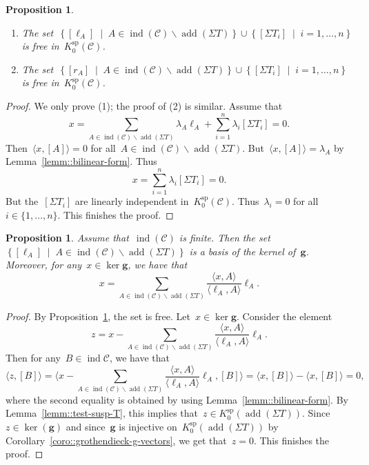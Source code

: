 \documentclass{amsart}
\newtheorem{proposition}[theorem]{Proposition}
\theoremstyle{definition}
\renewcommand{\b}[1]{{\boldsymbol{#1}}} %
\newcommand{\set}[2]{\left\{ #1 \;\middle|\; #2 \right\}} %
\newcommand{\ssm}{\smallsetminus} %
\newcommand{\cat}{\mathcal{C}}
\newcommand{\susp}{\Sigma}
\newcommand{\add}{\operatorname{add}}
\newcommand{\spl}{\operatorname{sp}}
\newcommand{\Ksp}{K_0^{\spl}}
\newcommand{\ind}{\operatorname{ind}}
\begin{document}
\begin{proposition}
\label{prop::free-set}
 \begin{enumerate}
  \item The set~$\set{[\ell_A]}{A\in \ind(\cat) \ssm \add(\susp T)} \cup \set{[\susp T_i]}{i=1, \dots, n}$ is free in~$\Ksp(\cat)$.
  \item The set~$\set{[r_A]}{A\in \ind(\cat) \ssm \add(\susp T)} \cup \set{[\susp T_i]}{i=1, \dots, n}$ is free in~$\Ksp(\cat)$.
 \end{enumerate}
\end{proposition}
\begin{proof}
 We only prove (1); the proof of (2) is similar.  Assume that~
 \[
  x= \sum_{A\in \ind(\cat) \ssm \add(\susp T)} \lambda_A \ell_A + \sum_{i=1}^n \lambda_i [\susp T_i] = 0.
 \]
 Then~$\langle x, [A] \rangle = 0$ for all~$A\in\ind(\cat) \ssm \add(\susp T)$.  But~$\langle x, [A] \rangle = \lambda_A$ by Lemma~\ref{lemm::bilinear-form}.  Thus~
 \[
  x = \sum_{i=1}^n \lambda_i [\susp T_i] = 0.
 \]
 But the~$[\susp T_i]$ are linearly independent in~$\Ksp(\cat)$.  Thus~$\lambda_i = 0$ for all~$i\in \{1, \ldots, n\}$.  This finishes the proof.
\end{proof}

\begin{proposition}
 Assume that~$\ind(\cat)$ is finite.  Then the set~$\set{[\ell_A]}{A\in \ind(\cat) \ssm \add(\susp T)}$ is a basis of the kernel of~$\b g$.  Moreover, for any~$x\in \ker \b g$, we have that
 \[
  x= \sum_{A\in \ind(\cat) \ssm \add(\susp T)} \frac{\langle x, A \rangle}{\langle \ell_A, A \rangle} \ell_A.
 \]
\end{proposition}
\begin{proof}
By Proposition~\ref{prop::free-set}, the set is free.  Let~$x\in \ker \b g$.  Consider the element
\[
 z = x- \sum_{A\in \ind(\cat) \ssm \add(\susp T)} \frac{\langle x, A \rangle}{\langle \ell_A, A \rangle} \ell_A.
\]
Then for any~$B\in \ind{\cat}$, we have that
\[
 \langle  z, [B] \rangle = \Big\langle x- \sum_{A\in \ind(\cat) \ssm \add(\susp T)} \frac{\langle x, A \rangle}{\langle \ell_A, A \rangle} \ell_A, [B] \Big\rangle = \langle x, [B] \rangle - \langle x, [B] \rangle = 0, 
\]
where the second equality is obtained by using Lemma~\ref{lemm::bilinear-form}.  By Lemma~\ref{lemm::test-susp-T}, this implies that~$z\in \Ksp(\add(\susp T))$.  Since~$z\in \ker(\b g)$ and since~$\b g$ is injective on~$\Ksp(\add (\susp T))$ by Corollary~\ref{coro::grothendieck-g-vectors}, we get that~$z=0$.  This finishes the proof.
\end{proof}
\end{document}
